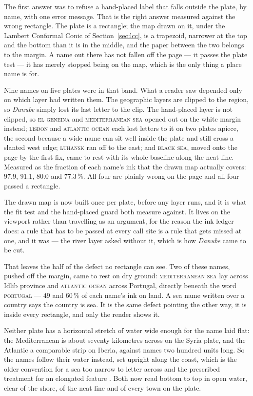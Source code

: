 \documentclass[11pt]{article}
\begin{document}
The first answer was to refuse a hand-placed label that falls outside the
plate, by name, with one error message. That is the right answer measured
against the wrong rectangle. The plate is a rectangle; the map drawn on
it, under the Lambert Conformal Conic of Section~\ref{sec:lcc}, is a
trapezoid, narrower at the top and the bottom than it is in the middle,
and the paper between the two belongs to the margin. A name out there has
not fallen off the page --- it passes the plate test --- it has merely
stopped being on the map, which is the only thing a place name is for.

Nine names on five plates were in that band. What a reader saw depended
only on which layer had written them. The geographic layers are clipped
to the region, so \emph{Danube} simply lost its last letter to the clip.
The hand-placed layer is not clipped, so \textsc{el geneina} and
\textsc{mediterranean sea} opened out on the white margin instead;
\textsc{lisbon} and \textsc{atlantic ocean} each lost letters to it on
two plates apiece, the second because a wide name can sit well inside the
plate and still cross a slanted west edge; \textsc{luhansk} ran off to
the east; and \textsc{black sea}, moved onto the page by the first fix,
came to rest with its whole baseline along the neat line. Measured as the
fraction of each name's ink that the drawn map actually covers: $97.9$,
$91.1$, $80.0$ and $77.3\,\%$. All four are plainly wrong on the page and
all four passed a rectangle.

The drawn map is now built once per plate, before any layer runs, and it
is what the fit test and the hand-placed guard both measure against. It
lives on the viewport rather than travelling as an argument, for the
reason the ink ledger does: a rule that has to be passed at every call
site is a rule that gets missed at one, and it was --- the river layer
asked without it, which is how \emph{Danube} came to be cut.

That leaves the half of the defect no rectangle can see. Two of these
names, pushed off the margin, came to rest on dry ground:
\textsc{mediterranean sea} lay across Idlib province and
\textsc{atlantic ocean} across Portugal, directly beneath the word
\textsc{portugal} --- $49$ and $60\,\%$ of each name's ink on land. A sea
name written over a country says the country is sea. It is the same
defect pointing the other way, it is inside every rectangle, and only the
render shows it.

Neither plate has a horizontal stretch of water wide enough for the name
laid flat: the Mediterranean is about seventy kilometres across on the
Syria plate, and the Atlantic a comparable strip on Iberia, against names
two hundred units long. So the names follow their water instead, set
upright along the coast, which is the older convention for a sea too
narrow to letter across and the prescribed treatment for an elongated
feature \parencite{imhof-names}. Both now read bottom to top in open water,
clear of the shore, of the neat line and of every town on the plate.
\end{document}

